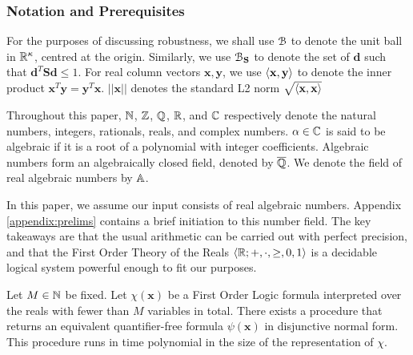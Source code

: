 \subsubsection*{Notation and Prerequisites}
For the purposes of discussing robustness, we shall use $\mathcal{B}$ to denote the unit ball in $\mathbb{R}^\kappa$, centred at the origin. Similarly, we use $\mathcal{B}_{\mathbf{S}}$ to denote the set of $\mathbf{d}$ such that $\mathbf{d}^T\mathbf{Sd} \le 1$. For real column vectors $\mathbf{x}, \mathbf{y}$, we use $\langle\mathbf{x}, \mathbf{y}\rangle$ to denote the inner product $\mathbf{x}^T\mathbf{y} = \mathbf{y}^T\mathbf{x}$. $||\mathbf{x}||$ denotes the standard L2 norm $\sqrt{\langle\mathbf{x}, \mathbf{x}\rangle}$

Throughout this paper,  $\mathbb{N}$, $\mathbb{Z}$, $\mathbb{Q}$, $\mathbb{R}$, and $\mathbb{C}$ respectively denote the natural numbers, integers, rationals, reals, and complex numbers. $\alpha \in \mathbb{C}$ is said to be algebraic if it is a root of a polynomial with integer coefficients. Algebraic numbers form an algebraically closed field, denoted by $\overline{\mathbb{Q}}$. We denote the field of real algebraic numbers by $\mathbb{A}$.

In this paper, we assume our input consists of real algebraic numbers. Appendix \ref{appendix:prelims} contains a brief initiation to this number field. The key takeaways are that the usual arithmetic can be carried out with perfect precision, and that the First Order Theory of the Reals $\langle\mathbb{R}; +, \cdot, \ge, 0, 1\rangle$ is a decidable logical system powerful enough to fit our purposes.

\begin{theorem}
\label{thm:renegar}
Let $M \in \mathbb{N}$ be fixed. Let $\chi(\mathbf{x})$ be a First Order Logic formula interpreted over the reals with fewer than $M$ variables in total. There exists a procedure that returns an equivalent quantifier-free formula $\psi(\mathbf{x})$ in disjunctive normal form. This procedure runs in time polynomial in the size of the representation of $\chi$.
\end{theorem} 


